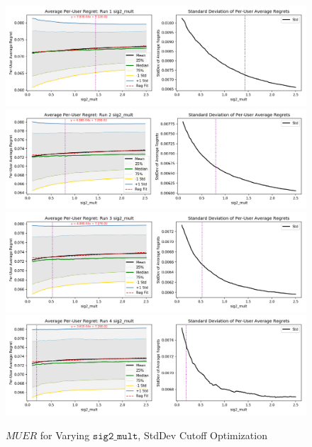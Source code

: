 	\begin{figure}[H]
	\includegraphics[width=1.1\textwidth,center]{figures/opt_param/opt_param_std_11100_sig2_mult1.png}%
	\newline
	\includegraphics[width=1.1\textwidth,center]{figures/opt_param/opt_param_std_11100_sig2_mult2.png}%
	\newline
	\includegraphics[width=1.1\textwidth,center]{figures/opt_param/opt_param_std_11100_sig2_mult3.png}%
	\newline
	\includegraphics[width=1.1\textwidth,center]{figures/opt_param/opt_param_std_11100_sig2_mult4.png}%
	\caption{$MUER$ for Varying $\mathtt{sig2\_mult}$, StdDev Cutoff Optimization}
	\end{figure}

